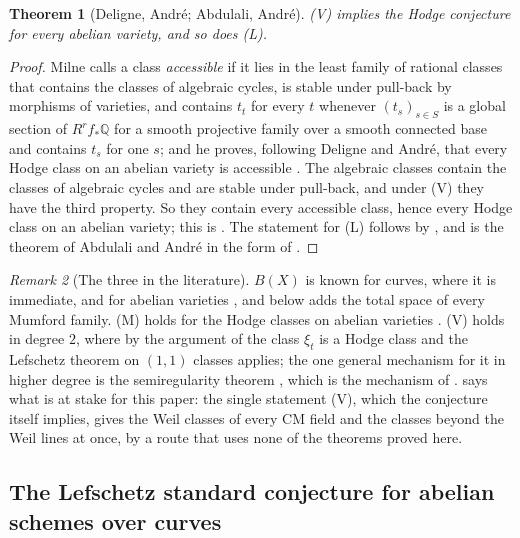 \documentclass[11pt,reqno]{amsart}
\theoremstyle{plain}
\newtheorem{theorem}{Theorem}[section]
\theoremstyle{definition}
\theoremstyle{remark}
\newtheorem{remark}[theorem]{Remark}
\newcommand{\QQ}{\mathbb{Q}}
\begin{document}
\begin{theorem}[Deligne, Andr\'e; Abdulali, Andr\'e]\label{thm:vhcab}
\textup{(V)} implies the Hodge conjecture for every abelian variety, and so
does \textup{(L)}.
\end{theorem}

\begin{proof}
Milne calls a class \emph{accessible} if it lies in the least family of
rational classes that contains the classes of algebraic cycles, is stable
under pull-back by morphisms of varieties, and contains $t_{t}$ for every $t$
whenever $(t_{s})_{s\in S}$ is a global section of $R^{r}f_{*}\QQ$ for a
smooth projective family over a smooth connected base and contains $t_{s}$
for one $s$; and he proves, following Deligne and Andr\'e, that every Hodge
class on an abelian variety is accessible \cite[\S5.1, Theorem~3]{Mil20}.
The algebraic classes contain the classes of algebraic cycles and are stable
under pull-back, and under \textup{(V)} they have the third property. So they
contain every accessible class, hence every Hodge class on an abelian
variety; this is \cite[Remark~2]{Mil20}. The statement for \textup{(L)}
follows by , and is the theorem of Abdulali and Andr\'e in
the form of \cite[Theorem~4]{Mil20}.
\end{proof}

\begin{remark}[The three in the literature]\label{rem:lmvknown}
$B(X)$ is known for curves, where it is immediate,
and for abelian varieties \cite[\S2]{Kle68}, and 
below adds the total space of every Mumford family. \textup{(M)} holds for the Hodge
classes on abelian varieties \cite[Th\'eor\`eme~0.6.2]{And96b}.
\textup{(V)} holds in degree $2$, where by the argument of
 the class $\xi_{t}$ is a Hodge class and the Lefschetz
theorem on $(1,1)$ classes applies; the one general mechanism for it in
higher degree is the semiregularity theorem \cite{Blo72,BF03,Pri24}, which is the
mechanism of \cite[Theorem~2.3]{paperII}.  says what is at
stake for this paper: the single statement \textup{(V)}, which the conjecture
itself implies, gives the Weil classes of every CM field and the classes
beyond the Weil lines at once, by a route that uses none of the theorems
proved here.
\end{remark}

\subsection{The Lefschetz standard conjecture for abelian schemes over curves}
\label{ssec:newlefschetz}
\end{document}
